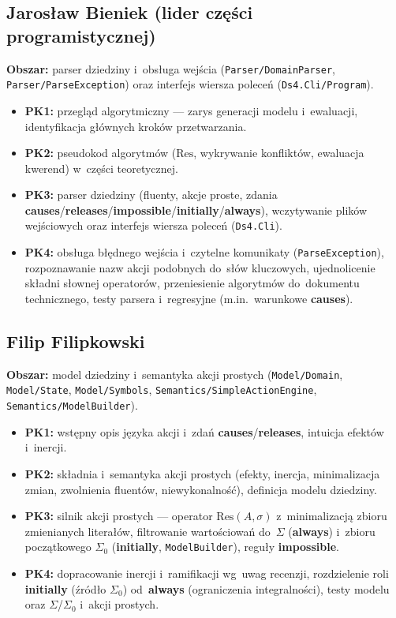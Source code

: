 \documentclass[11pt,a4paper]{article}
\newcommand{\Res}{\mathrm{Res}}
\begin{document}
\subsection*{Jarosław Bieniek (lider części programistycznej)}
\textbf{Obszar:} parser dziedziny i~obsługa wejścia (\texttt{Parser/DomainParser}, \texttt{Parser/ParseException}) oraz interfejs wiersza poleceń (\texttt{Ds4.Cli/Program}).
\begin{itemize}\setlength\itemsep{0.1em}
  \item \textbf{PK1:} przegląd algorytmiczny --- zarys generacji modelu i~ewaluacji, identyfikacja głównych kroków przetwarzania.
  \item \textbf{PK2:} pseudokod algorytmów ($\Res$, wykrywanie konfliktów, ewaluacja kwerend) w~części teoretycznej.
  \item \textbf{PK3:} parser dziedziny (fluenty, akcje proste, zdania \textbf{causes}/\textbf{releases}/\textbf{impossible}/\textbf{initially}/\textbf{always}), wczytywanie plików wejściowych oraz interfejs wiersza poleceń (\texttt{Ds4.Cli}).
  \item \textbf{PK4:} obsługa błędnego wejścia i~czytelne komunikaty (\texttt{ParseException}), rozpoznawanie nazw akcji podobnych do~słów kluczowych, ujednolicenie składni słownej operatorów, przeniesienie algorytmów do~dokumentu technicznego, testy parsera i~regresyjne (m.in.\ warunkowe \textbf{causes}).
\end{itemize}

\subsection*{Filip Filipkowski}
\textbf{Obszar:} model dziedziny i~semantyka akcji prostych (\texttt{Model/Domain}, \texttt{Model/State}, \texttt{Model/Symbols}, \texttt{Semantics/SimpleActionEngine}, \texttt{Semantics/ModelBuilder}).
\begin{itemize}\setlength\itemsep{0.1em}
  \item \textbf{PK1:} wstępny opis języka akcji i~zdań \textbf{causes}/\textbf{releases}, intuicja efektów i~inercji.
  \item \textbf{PK2:} składnia i~semantyka akcji prostych (efekty, inercja, minimalizacja zmian, zwolnienia fluentów, niewykonalność), definicja modelu dziedziny.
  \item \textbf{PK3:} silnik akcji prostych --- operator $\Res(A,\sigma)$ z~minimalizacją zbioru zmienianych literałów, filtrowanie wartościowań do~$\Sigma$ (\textbf{always}) i~zbioru początkowego $\Sigma_0$ (\textbf{initially}, \texttt{ModelBuilder}), reguły \textbf{impossible}.
  \item \textbf{PK4:} dopracowanie inercji i~ramifikacji wg~uwag recenzji, rozdzielenie roli \textbf{initially} (źródło $\Sigma_0$) od~\textbf{always} (ograniczenia integralności), testy modelu oraz $\Sigma$/$\Sigma_0$ i~akcji prostych.
\end{itemize}
\end{document}
